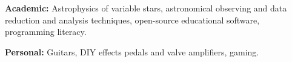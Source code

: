 \documentclass[]{friggeri-cv} %
\begin{document}
\textbf{Academic:} Astrophysics of variable stars, astronomical observing and data reduction and analysis techniques, open-source educational software, programming literacy.

\textbf{Personal:} Guitars, DIY effects pedals and valve amplifiers, gaming.



%
\end{document}

